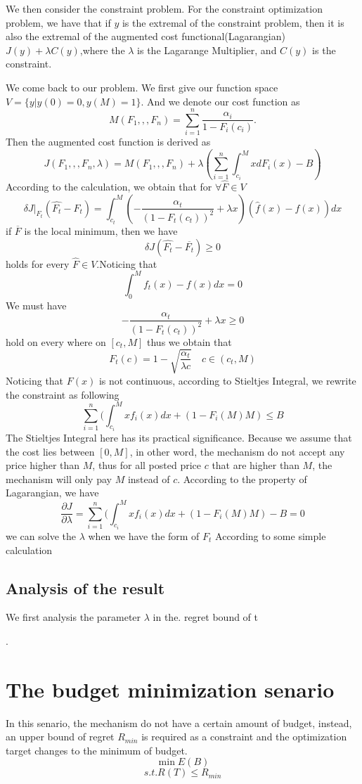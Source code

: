 \documentclass[10pt,conference,compsocconf,letterpaper]{IEEEtran}
\begin{document}
We then consider the constraint problem. For the constraint optimization problem, we have that if $y$ is the extremal of the constraint problem, then it is also the extremal of the augmented cost functional(Lagarangian) $J(y)+\lambda C(y)$,where the $\lambda$ is the Lagarange Multiplier, and $C(y)$ is the constraint.

We come back to our problem. We first give our function space $V=\{y|y(0)=0,y(M)=1\}$. And we denote our cost function as
\[M(F_1,,,F_n)= \sum_{i=1}^n \frac{\alpha_i}{1-F_i(c_i)}.\]
Then the augmented cost function is derived as
\[J(F_1,,,F_n,\lambda)=M(F_1,,,F_n)+\lambda( \sum_{i=1}^n\int_{c_i}^MxdF_i(x)-B) \]
According to the calculation, we obtain that for $\forall \hat{F}\in V$
\[\delta J|_{F_t}(\hat{F_t}-F_t)=\int_{c_t}^M(-\frac{\alpha_t}{(1-F_t(c_t))^2}+\lambda x)(\hat{f}(x)-f(x))dx\]
if $\overline{F}$ is the local minimum, then we have
\[\delta J(\hat{F_t}-\overline{F_t})\geq 0\]
holds for every $\hat{F}\in V$.Noticing that
\[\int_0^Mf_t(x)-f(x)dx=0\]
We must have 
\[-\frac{\alpha_t}{(1-F_t(c_t))^2}+\lambda x\geq 0\]
hold on every where on $[c_t,M]$
thus we obtain that
\[F_t(c)=1-\sqrt{\frac{\alpha_t}{\lambda c}}\quad c\in(c_t,M)\]
Noticing that $F(x)$ is not continuous, according to Stieltjes Integral, we rewrite the constraint as following
\[ \sum_{i=1}^n(\int_{c_i}^Mxf_i(x)dx+(1-F_i(M)M)\leq B\]
The Stieltjes Integral here has its practical significance. Because we assume that the cost lies between $[0,M]$, in other word, the mechanism do not accept any price higher than $M$, thus for all posted price $c$ that are higher than $M$, the mechanism will only pay $M$ instead of $c$. According to the property of Lagarangian, we have
\[\frac{\partial J}{\partial \lambda}=\sum_{i=1}^n(\int_{c_i}^Mxf_i(x)dx+(1-F_i(M)M)-B=0\]
we can solve the $\lambda$ when we have the form of $F_t$
According to some simple calculation
\subsection{Analysis of the result}
We first analysis the parameter $\lambda$ in the. regret bound of t


. 
\section{The budget minimization senario}
In this senario, the mechanism do not have a certain amount of budget, instead, an upper bound of regret $R_{min}$ is required as a constraint and the optimization target changes to the minimum of budget.
\[\min E(B)\]
\[s.t. R(T)\leq R_{min}\]
\end{document}
